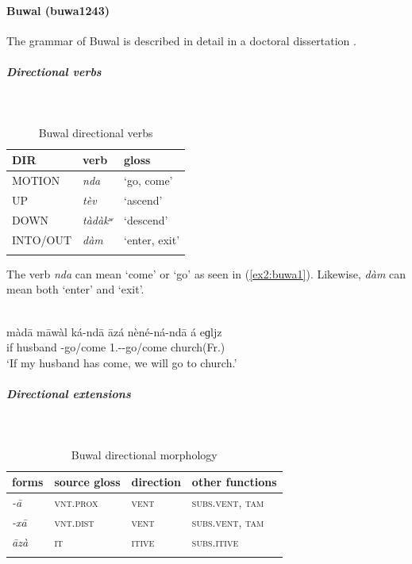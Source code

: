 \paragraph*{Buwal (buwa1243)} \label{buwa}

The grammar of Buwal is described in detail in a doctoral dissertation \citep{viljoenGrammaticalDescriptionBuwal2013}. 

\subparagraph{Directional verbs}~

\begin{table}[H]
	\caption{Buwal directional verbs} 
	\label{tab:buwaV}
	\begin{tabular}{lll} %
		\lsptoprule
		DIR & verb & gloss   \\ %
		\midrule
		MOTION & \textit{nda} & `go, come' \\
		UP & \textit{tèv} & `ascend' \\
		DOWN & \textit{tàdàkʷ} & `descend' \\
		INTO/OUT & \textit{dàm} & `enter, exit' \\
		\lspbottomrule
	\end{tabular}
\end{table}

The verb \textit{nda} can mean `come' or `go' as seen in (\ref{ex2:buwa1}). Likewise, \textit{dàm} can mean both `enter' and `exit'.

\ea\label{ex2:buwa1}
 \\
\gll  màdā māwàl ká-ndā āzá nèné-ná-ndā á eɡljz \\
if husband -go/come  1.--go/come  church(Fr.) \\
\glt `If my husband has come, we will go to church.'
\z

\subparagraph{Directional extensions}~

\begin{table}[H]
	\caption{Buwal directional morphology}
	\label{tab:buwa}
	\begin{tabular}{llll} %
		\lsptoprule
		forms & source gloss & direction  & other functions  \\ %
		\midrule
		\textit{-ā}  &  \textsc{vnt.prox}  &  \textsc{vent} &   \textsc{subs.vent}, \textsc{tam}  \\
		\textit{-xā}  &  \textsc{vnt.dist}  & \textsc{vent} &   \textsc{subs.vent}, \textsc{tam} \\
		\textit{āzà}  &  \textsc{it}  &   \textsc{itive}   &  \textsc{subs.itive} \\
		\lspbottomrule
	\end{tabular}
\end{table} 
\largerpage[-1]

